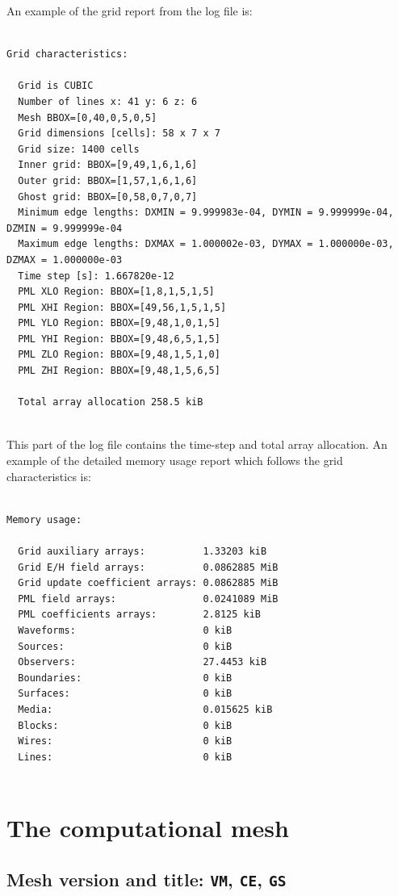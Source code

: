 \documentclass[onecolumn,a4paper]{article}
\numberwithin{equation}{section}
\begin{document}
An example of the grid report from the log file is:
\begin{verbatim}

Grid characteristics:

  Grid is CUBIC
  Number of lines x: 41 y: 6 z: 6
  Mesh BBOX=[0,40,0,5,0,5]
  Grid dimensions [cells]: 58 x 7 x 7
  Grid size: 1400 cells
  Inner grid: BBOX=[9,49,1,6,1,6]
  Outer grid: BBOX=[1,57,1,6,1,6]
  Ghost grid: BBOX=[0,58,0,7,0,7]
  Minimum edge lengths: DXMIN = 9.999983e-04, DYMIN = 9.999999e-04, DZMIN = 9.999999e-04
  Maximum edge lengths: DXMAX = 1.000002e-03, DYMAX = 1.000000e-03, DZMAX = 1.000000e-03
  Time step [s]: 1.667820e-12
  PML XLO Region: BBOX=[1,8,1,5,1,5]
  PML XHI Region: BBOX=[49,56,1,5,1,5]
  PML YLO Region: BBOX=[9,48,1,0,1,5]
  PML YHI Region: BBOX=[9,48,6,5,1,5]
  PML ZLO Region: BBOX=[9,48,1,5,1,0]
  PML ZHI Region: BBOX=[9,48,1,5,6,5]

  Total array allocation 258.5 kiB
  
\end{verbatim}  
This part of the log file contains the time-step and total array allocation. 
An example of the detailed memory usage report which follows the grid characteristics
is:
\begin{verbatim}

Memory usage:

  Grid auxiliary arrays:          1.33203 kiB
  Grid E/H field arrays:          0.0862885 MiB
  Grid update coefficient arrays: 0.0862885 MiB
  PML field arrays:               0.0241089 MiB
  PML coefficients arrays:        2.8125 kiB
  Waveforms:                      0 kiB
  Sources:                        0 kiB
  Observers:                      27.4453 kiB
  Boundaries:                     0 kiB
  Surfaces:                       0 kiB
  Media:                          0.015625 kiB
  Blocks:                         0 kiB
  Wires:                          0 kiB
  Lines:                          0 kiB
  
\end{verbatim}

%
%
\section{The computational mesh}
\label{sc:meshdefn}
%
%

\subsection{Mesh version and title: \texttt{VM}, \texttt{CE}, \texttt{GS}}
\end{document}
